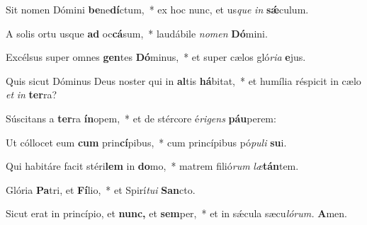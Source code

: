 \item Sit nomen Dómini \textbf{be}ne\textbf{dí}ctum,~* ex hoc nunc, et us\hspace{0.03em}\textit{que} \textit{in} \textbf{sǽ}culum.
\item A solis ortu usque \textbf{ad} oc\textbf{cá}sum,~* laudábile \textit{nomen} \textbf{Dó}mini.
\item Excélsus super omnes \textbf{gen}tes \textbf{Dó}minus,~* et super cælos gló\textit{ria} \textbf{e}jus.
\item Quis sicut Dóminus Deus noster qui in \textbf{al}tis \textbf{há}bitat,~* et humília réspicit in cælo \textit{et} \textit{in} \textbf{ter}ra?
\item Súscitans a \textbf{ter}ra \textbf{ín}opem,~* et de stércore é\hspace{0.03em}\textit{rigens} \textbf{páu}perem:
\item Ut cóllocet eum \textbf{cum} prin\textbf{cí}pibus,~* cum princípibus pó\textit{puli} \textbf{su}i.
\item Qui habitáre facit stéri\textbf{lem} in \textbf{do}mo,~* matrem filió\textit{rum} \textit{læ}\textbf{tán}tem.
\item Glória \textbf{Pa}tri, et \textbf{Fí}lio,~* et Spirí\hspace{0.03em}\textit{tui} \textbf{San}cto.
\item Sicut erat in princípio, et \textbf{nunc,} et \textbf{sem}per,~* et in sǽcula sæcu\hspace{0.03em}\textit{lórum.} \textbf{A}men.

